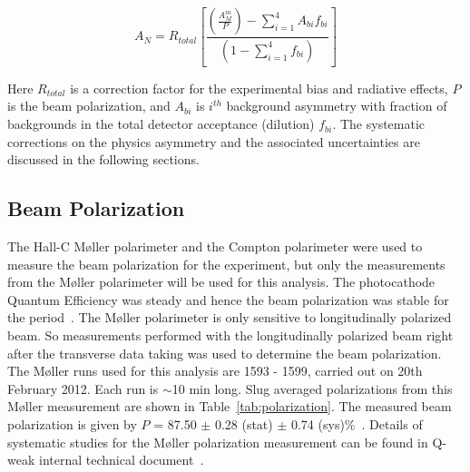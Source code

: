 \begin{equation} \label{equ:PhysicsAsymmetryShort}
A_{N} = R_{total} \left[ \frac{\left(\frac{A^{in}_{M}}{P}\right) - \sum^{4}_{i=1} A_{bi}f_{bi} }{ (1 -\sum^{4}_{i=1} f_{bi}) } \right]
\end{equation}

Here $R_{total}$ is a correction factor for the experimental bias and radiative effects, $P$ is the beam polarization, and $A_{bi}$ is $i^{th}$ background asymmetry with fraction of backgrounds in the total detector acceptance (dilution) $f_{bi}$. The systematic corrections on the physics asymmetry and the associated uncertainties are discussed in the following sections.


\subsection{Beam Polarization}
\label{Beam Polarization}
The Hall-C M{\o}ller polarimeter and the Compton polarimeter were used to measure the beam polarization for the experiment, but only the measurements from the M{\o}ller polarimeter will be used for this analysis. 
The photocathode Quantum Efficiency was steady and hence the beam polarization was stable for the period~\cite{magee_communication}. 
The M{\o}ller polarimeter is only sensitive to longitudinally polarized beam. So measurements performed with the longitudinally polarized beam right after the transverse data taking was used to determine the beam polarization. 
The M{\o}ller runs used for this analysis are 1593 - 1599, carried out on 20th February 2012. Each run is $\sim$10 min long. Slug averaged polarizations from this M{\o}ller measurement are shown in Table~\ref{tab:polarization}. The measured beam polarization is given by $P$ = 87.50 $\pm$ 0.28 (stat) $\pm$ 0.74 (sys)\%~\cite{elog:nur_ancillary91}. Details of systematic studies for the M{\o}ller polarization measurement can be found in Q-weak internal technical document~\cite{magee_moller}.

